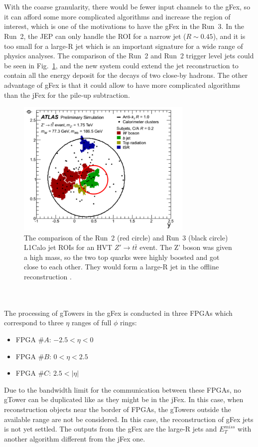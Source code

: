 \noindent
\\
\\With the coarse granularity, there would be fewer input channels to the gFex, so it can afford some more complicated algorithms and increase the region of interest, which is one of the motivations to have the gFex in the Run~3. In the Run~2, the JEP can only handle the ROI for a narrow jet ($R\sim 0.45$), and it is too small for a large-R jet which is an important signature for a wide range of physics analyses. The comparison of the Run~2 and Run~2 trigger level jets could be seen in Fig.~\ref{Fig:ZPrimett}, and the new system could extend the jet reconstruction to contain all the energy deposit for the decays of two close-by hadrons. The other advantage of gFex is that it could allow to have more complicated algorithms than the jFex for the pile-up subtraction. 
\begin{figure}[!h]                
	\includegraphics[width=0.75\textwidth]{Chapter6/TrigJetRange.png}
	\begin{center}
		\caption{The comparison of the Run~2 (red circle) and Run~3 (black circle) L1Calo jet ROIs for an HVT $Z'\to t\bar{t}$ event. The Z' boson was given a high mass, so the two top quarks were highly boosted and got close to each other. They would form a large-R jet in the offline reconstruction \cite{Tang:2289434}.  }
		\label{Fig:ZPrimett}            
	\end{center}
\end{figure}
\noindent
\\
\\The processing of gTowers in the gFex is conducted in three FPGAs which correspond to three $\eta$ ranges of full $\phi$ rings:
\begin{itemize}
	\item FPGA $\#A$: $-2.5<\eta<0$
	\item FPGA $\#B$: $0<\eta<2.5$
	\item FPGA $\#C$: $2.5<|\eta|$
\end{itemize}
Due to the bandwidth limit for the communication between these FPGAs, no gTower can be duplicated like as they might be in the jFex. In this case, when reconstruction objects near the border of FPGAs, the gTowers outside the available range are not be considered. In this case, the reconstruction of gFex jets is not yet settled. The outputs from the gFex are the large-R jets and $E^{miss}_{T}$ with another algorithm different from the jFex one.
